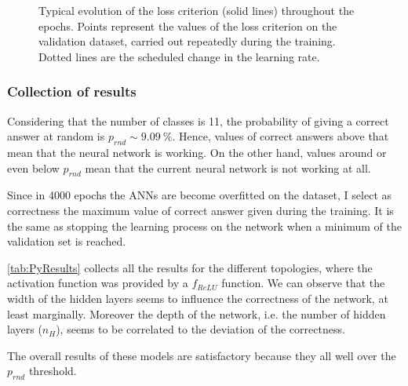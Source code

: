 \begin{figure}[htbp]
	\centering
	
	\caption{Typical evolution of the loss criterion (solid lines) throughout the epochs.
		Points represent the values of the loss criterion on the validation dataset, carried out repeatedly during the training.
		Dotted lines are the scheduled change in the learning rate.
	}
	\label{fig:PyTorch_learning}
\end{figure}


\subsubsection{Collection of results}
Considering that the number of classes is \num{11}, the probability of giving a correct answer at random is $p_{rnd}\sim \SI{9.09}{\percent}$.
Hence, values of correct answers above that mean that the neural network is working.
On the other hand, values around or even below $p_{rnd}$ mean that the current neural network is not working at all.

Since in \num{4000} epochs the \acp{ANN} are become overfitted on the dataset, I select as correctness the maximum value of correct answer given during the training.
It is the same as stopping the learning process on the network when a minimum of the validation set is reached.

\autoref{tab:PyResults} collects all the results for the different topologies, where the activation function was provided by a $f_{ReLU}$ function.
We can observe that the width of the hidden layers seems to influence the correctness of the network, at least marginally.
Moreover the depth of the network, i.e. the number of hidden layers ($n_H$), seems to be correlated to the deviation of the correctness.

The overall results of these models are satisfactory because they all well over the $p_{rnd}$ threshold.


